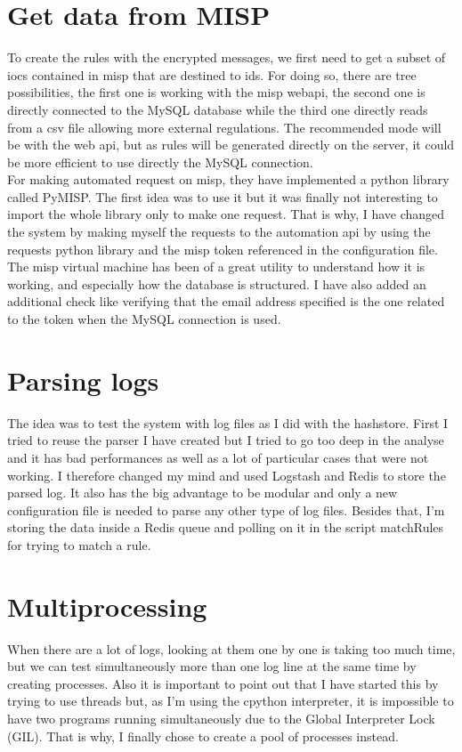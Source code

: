 \documentclass{eplmastersthesis}
\begin{document}
\section{Get data from MISP}
To create the rules with the encrypted messages, we first need to get a subset of \glspl{ioc} contained in \gls{misp} that are destined to \gls{ids}. 
For doing so, there are tree possibilities, the first one is working with the \gls{misp} web\gls{api}, the second one is directly connected to the MySQL database while the third one directly reads from a \gls{csv} file allowing more external regulations.
The recommended mode will be with the web \gls{api}, but as rules will be generated directly on the server, it could be more efficient to use directly the MySQL connection.\\

For making automated request on \gls{misp}, they have implemented a python library called PyMISP. The first idea was to use it but it was finally not interesting to import the whole library only to make one request. That is why, I have changed the system by making myself the requests to the automation \gls{api} by using the requests python library and the \gls{misp} token referenced in the configuration file.\\

The \gls{misp} virtual machine has been of a great utility to understand how it is working, and especially how the database is structured. I have also added an additional check like verifying that the email address specified is the one related to the token when the MySQL connection is used.

\section{Parsing logs}
The idea was to test the system with log files as I did with the hashstore. First I tried to reuse the parser I have created but I tried to go too deep in the analyse and it has bad performances as well as a lot of particular cases that were not working.
I therefore changed my mind and used Logstash and Redis to store the parsed log. 
It also has the big advantage to be modular and only a new configuration file is needed to parse any other type of log files.
Besides that, I'm storing the data inside a Redis queue and polling on it in the script matchRules for trying to match a rule. \\

\section{Multiprocessing}
When there are a lot of logs, looking at them one by one is taking too much time, but we can test simultaneously more than one log line at the same time by creating processes.
Also it is important to point out that I have started this by trying to use threads but, as I'm using the cpython interpreter, it is impossible to have two programs running simultaneously due to the Global Interpreter Lock (GIL). That is why, I finally chose to create a pool of processes instead.
\end{document}
